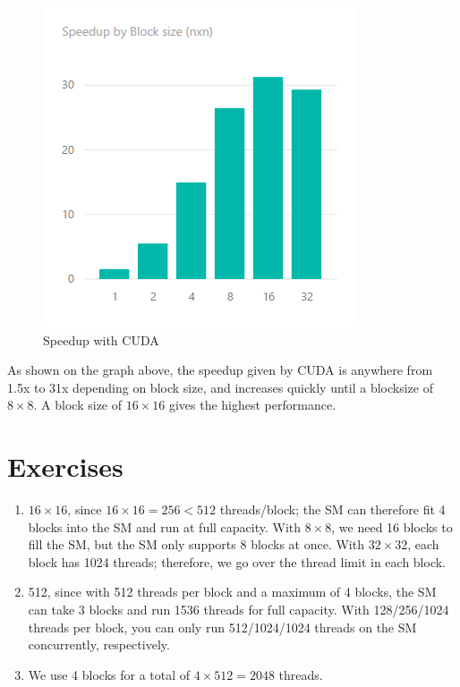 \documentclass[12pt]{article}
\begin{document}
\begin{figure}[h]
    \centering
    \caption{Speedup with CUDA}
    \includegraphics{pics/lw4.png}
\end{figure}

As shown on the graph above, the speedup given by CUDA is anywhere from 1.5x to 31x depending on block size, and increases quickly
until a blocksize of $8 \times 8$. A block size of $16 \times 16$ gives the highest performance.


\section{Exercises}

\begin{enumerate}
    \item $16 \times 16$, since $16 \times 16 = 256 < 512$ threads/block; the SM can therefore fit 4 blocks into the SM and run at full capacity.
          With $8 \times 8$, we need 16 blocks to fill the SM, but the SM only supports 8 blocks at once.
          With $32 \times 32$, each block has 1024 threads; therefore, we go over the thread limit in each block.
    \item 512, since with 512 threads per block and a maximum of 4 blocks, the SM can take 3 blocks and run 1536 threads for full capacity.
          With 128/256/1024 threads per block, you can only run 512/1024/1024 threads on the SM concurrently, respectively.
    \item We use 4 blocks for a total of $4 \times 512 = 2048$ threads.
\end{enumerate}

\end{document}
